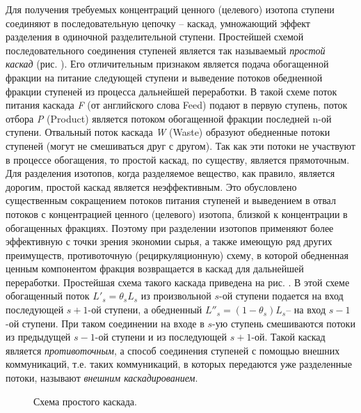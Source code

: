 Для получения требуемых концентраций ценного (целевого) изотопа ступени соединяют в последовательную цепочку -- каскад, умножающий эффект разделения в одиночной разделительной ступени. Простейшей схемой последовательного соединения ступеней является так называемый \textit{простой каскад} (рис. \cite{cas}). Его отличительным признаком является подача обогащенной фракции на питание следующей ступени и выведение потоков обедненной фракции ступеней из процесса дальнейшей переработки. В такой схеме поток питания каскада \textit{F} (от английского слова Feed) подают в первую ступень, поток отбора \textit{P} (Product) является потоком обогащенной фракции последней n-ой ступени. Отвальный поток каскада \textit{W} (Waste) образуют обедненные потоки ступеней (могут не смешиваться друг с другом). Так как эти потоки не участвуют в процессе обогащения, то простой каскад, по существу, является прямоточным. Для разделения изотопов, когда разделяемое вещество, как правило, является дорогим, простой каскад является неэффективным. Это обусловлено существенным сокращением потоков питания ступеней и выведением в отвал потоков с концентрацией ценного (целевого) изотопа, близкой к концентрации в обогащенных фракциях. Поэтому при разделении изотопов применяют более эффективную с точки зрения экономии сырья, а также  имеющую ряд других преимуществ, противоточную (рециркуляционную) схему, в которой обедненная ценным компонентом фракция возвращается в каскад для дальнейшей переработки. Простейшая схема такого каскада приведена на рис. \cite{image2}. В этой схеме обогащенный поток $L'_{s} =\theta _{s} L_{s} $ из произвольной $s$-ой ступени подается на вход последующей $s+1$-ой ступени, а обедненный $L''_{s} =(1-\theta _{s} )L_{s} $-- на вход $s-1$-ой ступени. При таком соединении на входе в $s$-ую ступень смешиваются потоки из предыдущей $s-1$-ой ступени и из последующей $s+1$-ой. Такой каскад является \textit{противоточным}, а способ соединения ступеней с помощью внешних коммуникаций, т.е. таких коммуникаций, в которых передаются уже разделенные потоки, называют\textit{ внешним каскадированием}.

\begin{figure}[ht]
  \caption{Схема простого каскада.}\label{cas}
\end{figure}

